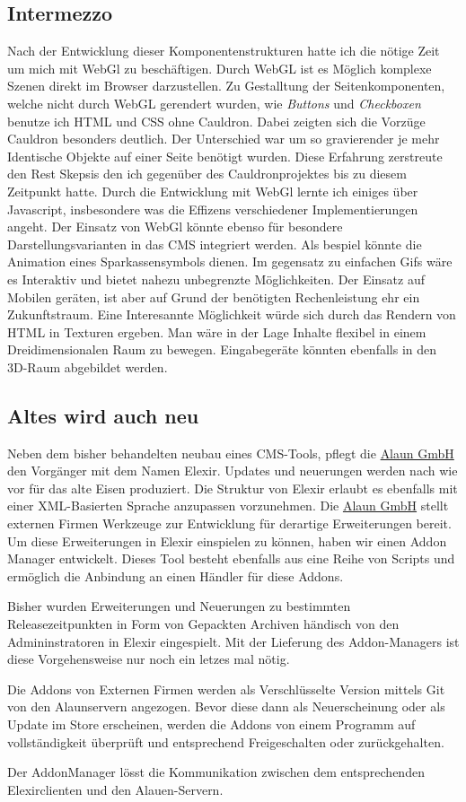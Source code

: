 \documentclass[12pt]{article}
\begin{document}
\subsection{Intermezzo}

Nach der Entwicklung dieser Komponentenstrukturen hatte ich die nötige Zeit um mich mit WebGl zu beschäftigen. Durch WebGL ist es Möglich
komplexe Szenen direkt im Browser darzustellen. Zu Gestalltung der Seitenkomponenten, welche nicht durch WebGL gerendert wurden, wie \textit{Buttons}
und \textit{Checkboxen} benutze ich HTML und CSS ohne Cauldron. Dabei zeigten sich die Vorzüge Cauldron besonders deutlich.
Der Unterschied war um so gravierender je mehr Identische Objekte auf einer Seite benötigt wurden. Diese Erfahrung zerstreute den Rest Skepsis
den ich gegenüber des Cauldronprojektes bis zu diesem Zeitpunkt hatte. Durch die Entwicklung mit WebGl lernte ich einiges über Javascript,
insbesondere was die Effizens verschiedener Implementierungen angeht. Der Einsatz von WebGl könnte ebenso für besondere Darstellungsvarianten
in das CMS integriert werden. Als bespiel könnte die Animation eines Sparkassensymbols dienen. Im gegensatz zu einfachen Gifs wäre es Interaktiv
und bietet nahezu unbegrenzte Möglichkeiten. Der Einsatz auf Mobilen geräten, ist aber auf Grund der benötigten Rechenleistung ehr ein
Zukunftstraum. Eine Interesannte Möglichkeit würde sich durch das Rendern von HTML in Texturen ergeben. Man wäre in der Lage Inhalte flexibel in
einem Dreidimensionalen Raum zu bewegen. Eingabegeräte könnten ebenfalls in den 3D-Raum abgebildet werden.

\subsection{Altes wird auch neu}

Neben dem bisher behandelten neubau eines CMS-Tools, pflegt die \href{https://alaun.de/home/}{Alaun GmbH} den Vorgänger mit dem Namen Elexir.
Updates und neuerungen werden nach wie vor für das alte Eisen produziert. Die Struktur von Elexir erlaubt es ebenfalls mit einer XML-Basierten
Sprache anzupassen vorzunehmen. Die \href{https://alaun.de/home/}{Alaun GmbH} stellt externen Firmen Werkzeuge zur Entwicklung für derartige
Erweiterungen bereit. Um diese Erweiterungen in Elexir einspielen zu können, haben wir einen Addon Manager entwickelt. Dieses Tool besteht
ebenfalls aus eine Reihe von Scripts und ermöglich die Anbindung an einen Händler für diese Addons.

Bisher wurden Erweiterungen und Neuerungen zu bestimmten Releasezeitpunkten in Form von Gepackten Archiven händisch von den Admininstratoren
in Elexir eingespielt. Mit der Lieferung des Addon-Managers ist diese Vorgehensweise nur noch ein letzes mal nötig.

Die Addons von Externen Firmen werden als Verschlüsselte Version mittels Git von den Alaunservern angezogen. Bevor diese dann als Neuerscheinung
oder als Update im Store erscheinen, werden die Addons von einem Programm auf vollständigkeit überprüft und entsprechend Freigeschalten oder
zurückgehalten. 

Der AddonManager lösst die Kommunikation zwischen dem entsprechenden Elexirclienten und den Alauen-Servern.
\end{document}
